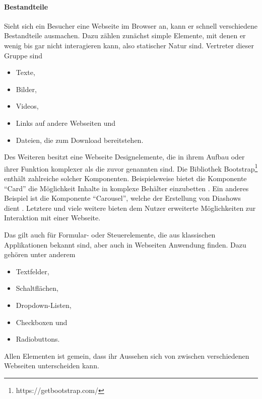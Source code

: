         \paragraph*{Bestandteile}
        Sieht sich ein Besucher eine Webseite im Browser an,
        kann er schnell verschiedene Bestandteile ausmachen.
        Dazu zählen zunächst simple Elemente, mit denen er wenig bis gar nicht
        interagieren kann, also statischer Natur sind.
        Vertreter dieser Gruppe sind

        \begin{itemize}
            \item Texte,
            \item Bilder,
            \item Videos,
            \item Links auf andere Webseiten und
            \item Dateien, die zum Download bereitstehen.
        \end{itemize}

        Des Weiteren besitzt eine Webseite Designelemente,
        die in ihrem Aufbau oder ihrer Funktion komplexer
        als die zuvor genannten sind.
        Die Bibliothek Bootstrap\footnote{https://getbootstrap.com/}
        enthält zahlreiche solcher Komponenten.
        Beispielsweise bietet die Komponente "`Card"' die Möglichkeit
        Inhalte in komplexe Behälter einzubetten \cite{bootstrap:Cards}.
        Ein anderes Beispiel ist die Komponente "`Carousel"',
        welche der Erstellung von Diashows dient \cite{bootstrap:Carousel}.
        Letztere und viele weitere bieten dem Nutzer
        erweiterte Möglichkeiten zur Interaktion mit einer Webseite.

        Das gilt auch für Formular- oder Steuerelemente,
        die aus klassischen Applikationen bekannt sind,
        aber auch in Webseiten Anwendung finden.
        Dazu gehören unter anderem

        \begin{itemize}
            \item Textfelder,
            \item Schaltflächen,
            \item Dropdown-Listen,
            \item Checkboxen und
            \item Radiobuttons.
        \end{itemize}

        Allen Elementen ist gemein, dass ihr Aussehen sich von
        zwischen verschiedenen Webseiten unterscheiden kann.

